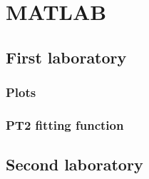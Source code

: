 \newpage


\section{MATLAB} \label{appendix:matlab}

\subsection{First laboratory}

\subsubsection{Plots}

\subsubsection{PT2 fitting function}


\newpage

\subsection{Second laboratory}
